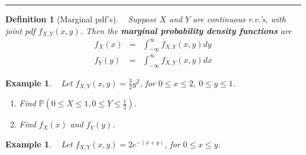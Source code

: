 \documentclass[12pt]{amsart}
\newtheorem{definition}[theorem]{Definition}
\newtheorem{example}[theorem]{Example}
\newcommand\Pbb{\mathbb{P}}
\newcommand\pdfX{f_X(x)}
\newcommand\pdfY{f_Y(y)}
\newcommand\pdfXY{f_{X,Y}(x,y)}
\begin{document}
{%
\vspace{.5cm}
\hrule
\vspace{.5cm}


\begin{definition}[Marginal pdf's]\ \newline
Suppose $X$ and $Y$ are continuous r.v.'s, with joint pdf $\pdfXY$. Then the \textbf{marginal probability density functions} are
\begin{eqnarray*}
\pdfX&=& \int_{-\infty}^{\infty} \pdfXY dy\\
\pdfY&=& \int_{-\infty}^{\infty} \pdfXY dx
\end{eqnarray*}

\end{definition}


\newpage

\begin{example}\ %
Let $\pdfXY = \frac32 y^2$, for $0 \leq x \leq 2, \ 0 \leq y \leq 1$.

\vspace{.5cm}

\begin{enumerate}
\item Find $\Pbb(0 \leq X \leq 1, 0 \leq Y \leq \frac12)$.
\vspace{10cm}



\item Find $\pdfX$ and $\pdfY$.
\vspace{6cm}

\end{enumerate}

\end{example}

\newpage

\begin{example}\ %
Let $\pdfXY = 2 e^{-(x+y)}$, for $0 \leq x \leq y$.


\end{example}}
\end{document}
